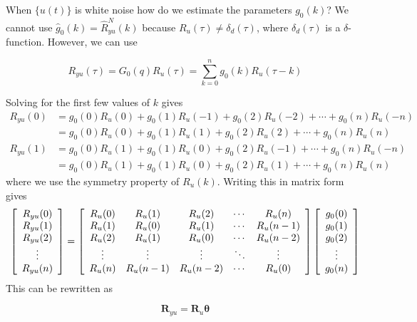 When $\{u(t)\}$ is white noise how do we estimate the parameters $g_0(k)$? We cannot use $\hat{g}_0(k) = \hat{R}_{yu}^N(k)$ because $R_u(\tau)\neq \delta_d(\tau)$, where $\delta_d(\tau)$ is a $\delta$-function.
However, we can use

\begin{equation*}
R_{yu}(\tau) = G_0(q)R_u(\tau) = \sum_{k=0}^n g_0(k)R_u(\tau-k)
\end{equation*}

Solving for the first few values of $k$ gives
\begin{align*}
R_{yu}(0) &= g_0(0)R_u(0) + g_0(1)R_u(-1) + g_0(2)R_u(-2) + \cdots + g_0(n)R_u(-n) \\
&= g_0(0)R_u(0) + g_0(1)R_u(1) + g_0(2)R_u(2) + \cdots + g_0(n)R_u(n) \\
R_{yu}(1) &= g_0(0)R_u(1) + g_0(1)R_u(0) + g_0(2)R_u(-1) + \cdots + g_0(n)R_u(-n) \\
&= g_0(0)R_u(1) + g_0(1)R_u(0) + g_0(2)R_u(1) + \cdots + g_0(n)R_u(n)
\end{align*}
where we use the symmetry property of $R_u(k)$.
Writing this in matrix form gives
\begin{align*}
\left[\begin{array}{c}
R_{yu}(0) \\ R_{yu}(1) \\ R_{yu}(2) \\ \vdots \\ R_{yu}(n)
\end{array}\right] =
\left[\begin{array}{c c c c c}
R_u(0) & R_u(1) & R_u(2) & \cdots & R_u(n) \\
R_u(1) & R_u(0) & R_u(1) & \cdots & R_u(n-1) \\
R_u(2) & R_u(1) & R_u(0) & \cdots & R_u(n-2) \\
\vdots & \vdots & \vdots & \ddots & \vdots \\
R_u(n) & R_u(n-1) & R_u(n-2) & \cdots & R_u(0)
\end{array}\right]
\left[\begin{array}{c}
g_0(0) \\ g_0(1) \\ g_0(2) \\ \vdots \\ g_0(n)
\end{array}\right]
\end{align*}
This can be rewritten as

\begin{equation*}
\mathbf{R}_{yu} = \mathbf{R}_u\mathbf{\theta}
\end{equation*}

